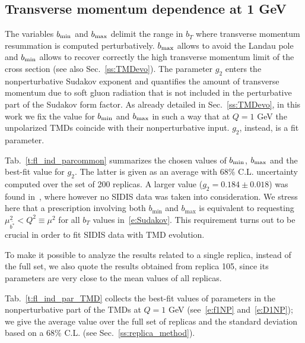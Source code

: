 \documentclass[aps,preprintnumbers,showpacs,nofootinbib,superscriptaddress,floatfix]{revtex4}
\newcommand{\AS}[1]{{\textcolor[rgb]{1,0,1}{#1}}}
\newcommand{\bb}{b}
\begin{document}
\subsection{Transverse momentum dependence at 1 GeV}
\label{ss:bestfit_TMDs}

The variables $\bb_{\rm min}$ and $\bb_{\rm max}$ delimit the range in $b_T$ where transverse momentum resummation is computed perturbatively. $\bb_{\rm max}$ allows to avoid the Landau pole and $\bb_{\rm min}$ allows to recover correctly the high transverse momentum limit of the cross section (see also Sec.~\ref{ss:TMDevo}).
\AS{The p}arameter $g_2$ enters the nonperturbative Sudakov exponent and
quantifies the amount of transverse momentum 
due to soft gluon radiation that is not included in the
perturbative part of the Sudakov form factor.
As already detailed in Sec.~\ref{ss:TMDevo}, in this work we fix the value for
$\bb_{\rm min}$ and $\bb_{\rm max}$ in such a way that at $Q=1$ GeV the
unpolarized TMDs coincide with their nonperturbative input. $g_2$, instead, is
a fit parameter. 

Tab.~\ref{t:fl_ind_parcommon} summarizes the chosen values of $\bb_{\rm min}$,
$\bb_{\rm max}$ and the best-fit value for $g_2$. The latter is given as an
average with $68\%$ C.L. uncertainty computed over the set of 200 replicas. A
larger value ($g_2 = 0.184 \pm 0.018$) was found in~\cite{Konychev:2005iy},
where however no SIDIS data was taken into consideration.
We stress here that a prescription involving both $\bb_{\text{min}}$ and
$\bb_{\text{max}}$ is equivalent to requesting $\mu_{\bar{b^*}}^2 < Q^2 \equiv
\mu^2$ for all $b_T$ values in~\eqref{e:Sudakov}. This requirement turns out
to be crucial in order to fit SIDIS data with TMD evolution.

To make it possible to analyze the results related to a single replica,
instead of the full set, we also quote the results obtained from
replica 105, since its parameters are very close to the
mean values of all replicas. 

Tab.~\ref{t:fl_ind_par_TMD} collects the best-fit values of parameters in the nonperturbative part of the TMDs at $Q=1$ GeV (see~\eqref{e:f1NP} and~\eqref{e:D1NP}); we give the average value over the full set of replicas and the standard deviation based on a $68\%$ C.L. (see Sec.~\ref{ss:replica_method}). 
\end{document}
